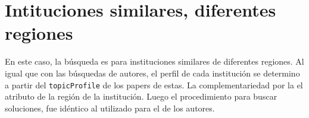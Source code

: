\section{Intituciones similares, diferentes regiones}
En este caso, la búsqueda es para instituciones similares de diferentes regiones. Al igual que con las 
búsquedas de autores, el perfil de cada institución se determino a partir del \texttt{topicProfile} de los papers
de estas. La complementariedad por la el atributo de la región de la institución. 
Luego el procedimiento para buscar soluciones, fue idéntico al utilizado para el de los autores.